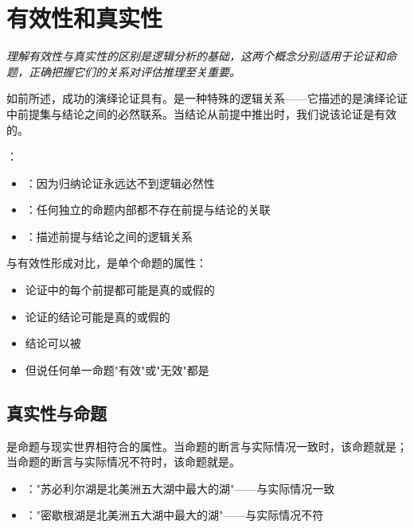 \section{有效性和真实性}

\begin{logicbox}[title=引言]
\textit{理解有效性与真实性的区别是逻辑分析的基础，这两个概念分别适用于论证和命题，正确把握它们的关系对评估推理至关重要。}
\end{logicbox}

如前所述，成功的演绎论证具有。是一种特殊的逻辑关系——它描述的是演绎论证中前提集与结论之间的必然联系。当结论从前提中推出时，我们说该论证是有效的。

\begin{theorembox}[title=有效性的适用范围]
：
\begin{itemize}
  \item {}：因为归纳论证永远达不到逻辑必然性
  \item {}：任何独立的命题内部都不存在前提与结论的关联
  \item {}：描述前提与结论之间的逻辑关系
\end{itemize}
\end{theorembox}

与有效性形成对比，是单个命题的属性：
\begin{itemize}
  \item 论证中的每个前提都可能是真的或假的
  \item 论证的结论可能是真的或假的
  \item 结论可以被
  \item 但说任何单一命题"有效"或"无效"都是
\end{itemize}

\subsection{真实性与命题}

是命题与现实世界相符合的属性。当命题的断言与实际情况一致时，该命题就是；当命题的断言与实际情况不符时，该命题就是。

\begin{examplebox}[title=真实性的例子]
\begin{itemize}
  \item {}："苏必利尔湖是北美洲五大湖中最大的湖"——与实际情况一致
  \item {}："密歇根湖是北美洲五大湖中最大的湖"——与实际情况不符
\end{itemize}
\end{examplebox}

